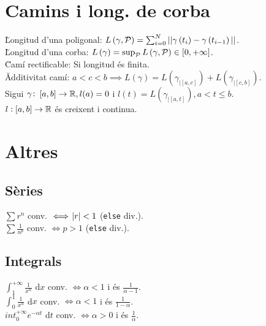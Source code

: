 \section{Camins i long. de corba}

\u{Longitud d'una poligonal}: $L\left( \gamma, \mathcal{P} \right) = \sum_{i=0}^N ||\gamma\left( t_i \right) - \gamma\left( t_{i-1} \right)||$. \\
\u{Longitud d'una corba}: $L\left( \gamma \right) = \sup_{\mathcal{P}} L\left( \gamma, \mathcal{P} \right) \in [0, +\infty]$. \\
\u{Camí rectificable}: Si longitud \'es finita. \\
\u{Additivitat camí}: $a<c<b \implies L\left( \gamma \right) = L( \gamma_{|\left[ a,c \right]} ) + L( \gamma_{|\left[ c, b \right]} )$. \\
\ci Sigui $\gamma\colon \left[ a,b \right]\to\mathbb{R}, l(a) = 0$ i $l(t) = L( \gamma_{|\left[ a,t \right]} ), a < t \leq b$. \\
\ci $l :\left[ a,b \right]\to\mathbb{R}$ \'es creixent i continua. \\





























\section{Altres}

\subsection{Sèries}
\ci $\sum r^n$ conv. $\iff \abs{r} < 1$ (\verb|else| div.). \\
\ci $\sum \frac{1}{n^p}$ conv. $\iff p > 1$ (\verb|else| div.).

\subsection{Integrals}
\ci $\int_1^{+\infty} \frac{1}{x^\alpha}$ d$x$ conv. $\iff \alpha < 1$ i és $\frac{1}{\alpha-1}$. \\
\ci $\int_0^1 \frac{1}{x^\alpha}$ d$x$ conv. $\iff \alpha < 1$ i és $\frac{1}{1-\alpha}$. \\
\ci $int_0^{+\infty} e^{-\alpha t}$ d$t$ conv. $\iff \alpha > 0$ i és $\frac{1}{\alpha}$.

